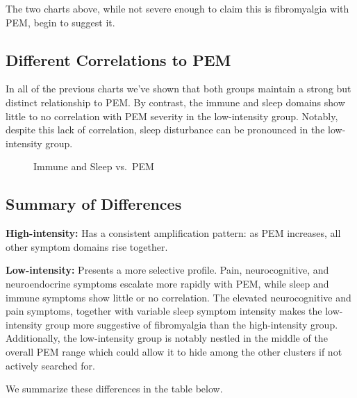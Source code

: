 \documentclass[
  letterpaper,
  DIV=11,
  numbers=noendperiod]{scrartcl}
\begin{document}
\FloatBarrier

The two charts above, while not severe enough to claim this is
fibromyalgia with PEM, begin to suggest it.

\subsection{Different Correlations to
PEM}\label{different-correlations-to-pem}

In all of the previous charts we've shown that both groups maintain a
strong but distinct relationship to PEM. By contrast, the immune and
sleep domains show little to no correlation with PEM severity in the
low-intensity group. Notably, despite this lack of correlation, sleep
disturbance can be pronounced in the low-intensity group.

\begin{figure}[h]


\caption{\label{fig-distinct}Immune and Sleep vs.~PEM}

\end{figure}%

\FloatBarrier

\subsection{Summary of Differences}\label{summary-of-differences}

\textbf{High-intensity:} Has a consistent amplification pattern: as PEM
increases, all other symptom domains rise together.

\textbf{Low-intensity:} Presents a more selective profile. Pain,
neurocognitive, and neuroendocrine symptoms escalate more rapidly with
PEM, while sleep and immune symptoms show little or no correlation. The
elevated neurocognitive and pain symptoms, together with variable sleep
symptom intensity makes the low-intensity group more suggestive of
fibromyalgia than the high-intensity group. Additionally, the
low-intensity group is notably nestled in the middle of the overall PEM
range which could allow it to hide among the other clusters if not
actively searched for.

We summarize these differences in the table below.\bigskip
\end{document}
